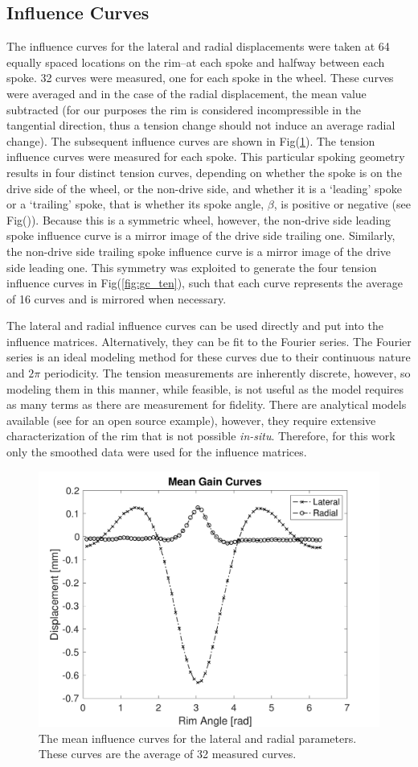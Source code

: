 \documentclass[journal]{IEEEtran}
\begin{document}
\subsection{Influence Curves}
The influence curves for the lateral and radial displacements were taken at 64 equally spaced locations on the rim--at each spoke and halfway between each spoke.  32 curves were measured, one for each spoke in the wheel.  These curves were averaged and in the case of the radial displacement, the mean value subtracted (for our purposes the rim is considered incompressible in the tangential direction, thus a tension change should not induce an average radial change).  The subsequent influence curves are shown in Fig(\ref{fig:gclr}).  The tension influence curves were measured for each spoke.  This particular spoking geometry results in four distinct tension curves, depending on whether the spoke is on the drive side of the wheel, or the non-drive side, and whether it is a `leading' spoke or a `trailing' spoke, that is whether its spoke angle, $\beta$, is positive or negative (see Fig()).  Because this is a symmetric wheel, however, the non-drive side leading spoke influence curve is a mirror image of the drive side trailing one.  Similarly, the non-drive side trailing spoke influence curve is a mirror image of the drive side leading one. This symmetry was exploited to generate the four tension influence curves in Fig(\ref{fig:gc_ten}), such that each curve represents the average of 16 curves and is mirrored when necessary.

The lateral and radial influence curves can be used directly and put into the influence matrices.  Alternatively, they can be fit to the Fourier series. The Fourier series is an ideal modeling method for these curves due to their continuous nature and $2\pi$ periodicity. The tension measurements are inherently discrete, however, so modeling them in this manner, while feasible, is not useful as the model requires as many terms as there are measurement for fidelity. There are analytical models available (see \cite{ModeMatrix} for an open source example), however, they require extensive characterization of the rim that is not possible \emph{in-situ}.  Therefore, for this work only the smoothed data were used for the influence matrices.  

\begin{figure}[!t]
\centering
\includegraphics[width=3.25 in]{./figs/gc_lat_rad}
\caption{The mean influence curves for the lateral and radial parameters.  These curves are the average of 32 measured curves.}
\label{fig:gclr}
\end{figure}
\end{document}
